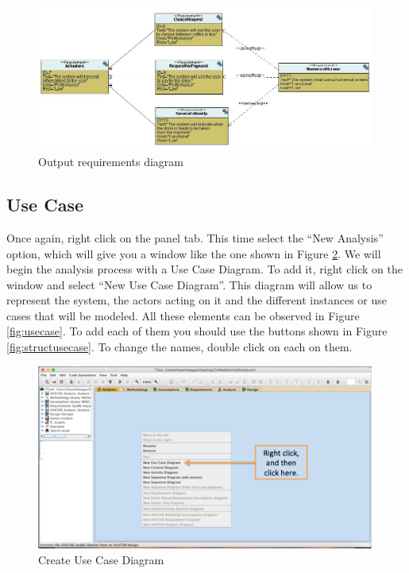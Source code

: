 \documentclass[12pt]{article}
\begin{document}
\begin{figure}[htbp]
\centering
\includegraphics[width=0.99\textwidth]{fig/outputreq.jpg}
\caption{Output requirements diagram} \label{fig:outputreq}
\end{figure}

\subsection{Use Case}
	Once again, right click on the panel tab. This time select the “New Analysis” option, which will give you a window like the one shown in Figure \ref{fig:createusecase}. We will begin the analysis process with a Use Case Diagram. To add it, right click on the window and select “New Use Case Diagram”. This diagram will allow us to represent the system, the actors acting on it and the different instances or use cases that will be modeled. All these elements can be observed in Figure \ref{fig:usecase}. To add each of them you should use the buttons shown in Figure \ref{fig:structusecase}. To change the names, double click on each on them.
	
\begin{figure}[htbp]
\centering
\includegraphics[width=0.99\textwidth]{fig/createusecase.png}
\caption{Create Use Case Diagram} \label{fig:createusecase}
\end{figure}
\end{document}

